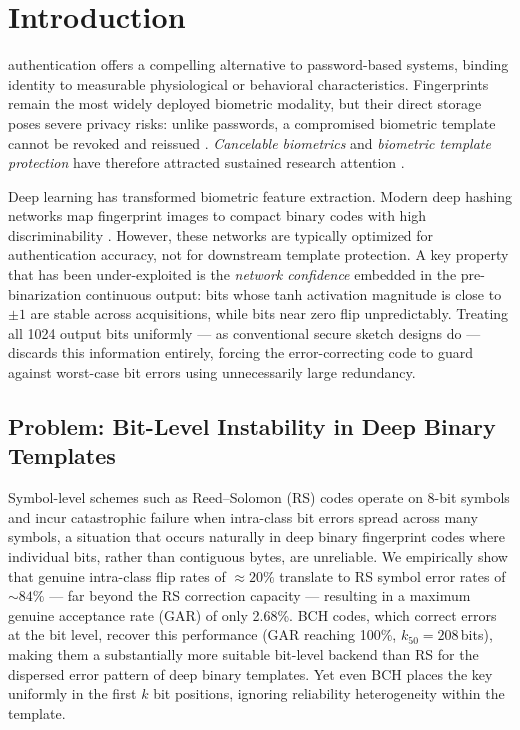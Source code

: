 \documentclass[journal]{IEEEtran}
\begin{document}
\IEEEpeerreviewmaketitle

\section{Introduction}
\label{sec:intro}

 authentication offers a compelling
alternative to password-based systems, binding identity to
measurable physiological or behavioral characteristics.
Fingerprints remain the most widely deployed biometric modality,
but their direct storage poses severe privacy risks: unlike passwords,
a compromised biometric template cannot be revoked and reissued
\cite{jain2008biometric}.
\emph{Cancelable biometrics} and \emph{biometric template protection}
have therefore attracted sustained research attention
\cite{ratha2001enhancing,nandakumar2015biometric}.

Deep learning has transformed biometric feature extraction.
Modern deep hashing networks map fingerprint images to compact
binary codes with high discriminability \cite{jin2017deep}.
However, these networks are typically optimized for authentication
accuracy, not for downstream template protection.
A key property that has been under-exploited is the \emph{network
confidence} embedded in the pre-binarization continuous output:
bits whose tanh activation magnitude is close to $\pm 1$ are stable
across acquisitions, while bits near zero flip unpredictably.
Treating all 1024 output bits uniformly — as conventional secure
sketch designs do — discards this information entirely, forcing the
error-correcting code to guard against worst-case bit errors
using unnecessarily large redundancy.

\subsection*{Problem: Bit-Level Instability in Deep Binary Templates}

Symbol-level schemes such as Reed--Solomon (RS) codes operate on
8-bit symbols and incur catastrophic failure when intra-class bit
errors spread across many symbols, a situation that occurs naturally
in deep binary fingerprint codes where individual bits, rather than
contiguous bytes, are unreliable.
We empirically show that genuine intra-class flip rates of
$\approx\!20\%$ translate to RS symbol error rates of ${\sim}84\%$
— far beyond the RS correction capacity — resulting in a maximum
genuine acceptance rate (GAR) of only 2.68\%.
BCH codes, which correct errors at the bit level, recover this
performance (GAR reaching 100\%, $k_{50}\!=\!208$\,bits), making
them a substantially more suitable bit-level backend than RS
for the dispersed error pattern of deep binary templates.
Yet even BCH places the key uniformly in the first $k$ bit positions,
ignoring reliability heterogeneity within the template.
\end{document}
